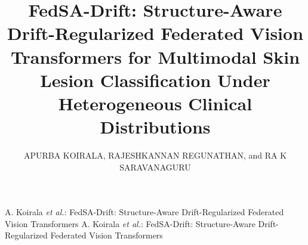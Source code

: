 \documentclass{ieeeaccess}
\begin{document}

\title{FedSA-Drift: Structure-Aware Drift-Regularized Federated Vision Transformers for Multimodal Skin Lesion Classification Under Heterogeneous Clinical Distributions}
\author{\uppercase{Apurba Koirala},
\uppercase{Rajeshkannan Regunathan}, and
\uppercase{RA K Saravanaguru}}
\address[1]{School of Computer Science and Engineering, Vellore Institute of Technology,
Vellore 632014, India (e-mail: apurbakoirala33@gmail.com; rajeshkannan.r@vit.ac.in; saravanank@vit.ac.in)}

\markboth
{A. Koirala \textit{et al.}: FedSA-Drift: Structure-Aware Drift-Regularized Federated Vision Transformers}
{A. Koirala \textit{et al.}: FedSA-Drift: Structure-Aware Drift-Regularized Federated Vision Transformers}

\end{document}
